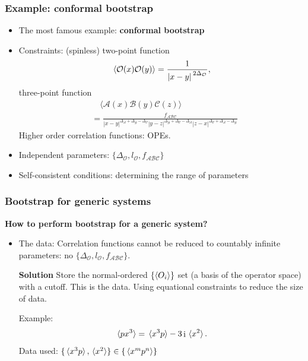 \documentclass{beamer}
\DeclareMathOperator{\ii}{i}
\newcommand{\concept}[1]{\textbf{#1}}
\begin{document}
\begin{frame}
\frametitle{Example: conformal bootstrap}

\begin{itemize}
    \item The most famous example: \concept{conformal bootstrap}
    \item Constraints: (spinless) two-point function 
    \begin{equation}
        \expval*{\mathcal{O}(x) \mathcal{O}(y)} = \frac{1}{\abs*{x - y}^{2 \Delta_\mathcal{O}}},
    \end{equation}
    three-point function 
    \begin{equation}
        \begin{aligned}
            &\quad \langle\mathcal{A}(x) \mathcal{B}(y) \mathcal{C}(z)\rangle \\
            &= \frac{f_{\mathcal{A B C}}}{|x-y|^{\Delta_{\mathcal{A}}+\Delta_{\mathcal{B}}-\Delta_{\mathcal{C}}}|y-z|^{\Delta_{\mathcal{B}}+\Delta_{\mathcal{C}}-\Delta_{\mathcal{A}}}|z-x|^{\Delta_{\mathcal{C}}+\Delta_{\mathcal{A}}-\Delta_{\mathcal{B}}}}
        \end{aligned}
    \end{equation}
    Higher order correlation functions: OPEs. 
    \item Independent parameters: $\{\Delta_{\mathcal{O}}, l_{\mathcal{O}}, f_{\mathcal{A} \mathcal{B} \mathcal{C}}\}$
    \item Self-consistent conditions: determining the range of parameters
\end{itemize}

\end{frame}

\begin{frame}
\frametitle{Bootstrap for generic systems}

\textbf{How to perform bootstrap for a generic system?}    

\begin{itemize}
    \item The data: Correlation functions cannot be reduced to countably infinite parameters: 
    no $\{\Delta_{\mathcal{O}}, l_{\mathcal{O}}, f_{\mathcal{A} \mathcal{B} \mathcal{C}}\}$.
    
    \textbf{Solution} Store the normal-ordered $\{\expval{O_i}\}$ set (a basis of the operator space) with a cutoff. This is the data.
    Using equational constraints to reduce the size of data.

    Example:
    \begin{equation}
        \expval*{p x^3} = \expval*{x^3 p} - 3 \ii \expval*{x^2}.
    \end{equation}
    Data used: $\{ \expval*{x^3 p}, \expval*{x^2} \} \in \{\expval*{x^m p^n}\}$
\end{itemize}

\end{frame}
\end{document}
